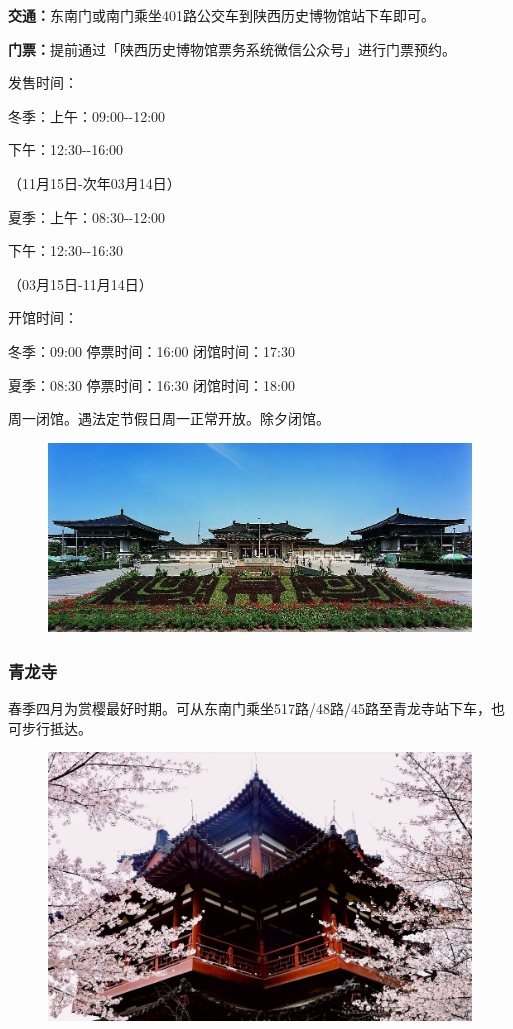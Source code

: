 \documentclass[
decoration,  %
]{qyxf-book}
\begin{document}
\textbf{交通：}东南门或南门乘坐401路公交车到陕西历史博物馆站下车即可。

\textbf{门票：}提前通过「陕西历史博物馆票务系统微信公众号」进行门票预约。

发售时间：

冬季：上午：09:00-\/-12:00

下午：12:30-\/-16:00

（11月15日-次年03月14日）

夏季：上午：08:30-\/-12:00

下午：12:30-\/-16:30

（03月15日-11月14日）

开馆时间：

冬季：09:00 停票时间：16:00 闭馆时间：17:30

夏季：08:30 停票时间：16:30 闭馆时间：18:00

周一闭馆。遇法定节假日周一正常开放。除夕闭馆。

\begin{figure}[htbp]
	\centering
	\includegraphics[width=0.8\linewidth]{pics/image27.jpg}
\end{figure}

\subsubsection{青龙寺}

春季四月为赏樱最好时期。可从东南门乘坐517路/48路/45路至青龙寺站下车，也可步行抵达。

\begin{figure}[htbp]
	\centering
	\includegraphics[width=0.65\linewidth]{pics/image28.jpg}
\end{figure}
\end{document}
